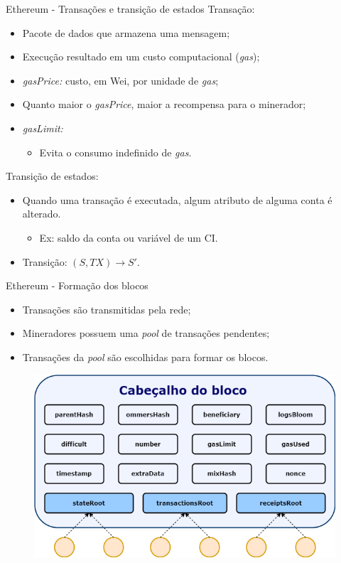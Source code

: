 \begin{frame}{Ethereum - Transações e transição de estados}
Transação: 
    \begin{itemize}
        \item Pacote de dados que armazena uma mensagem;
        \item Execução resultado em um custo computacional (\textit{gas});
        \item \textit{gasPrice:} custo, em Wei, por unidade de \textit{gas};
        \item Quanto maior o \textit{gasPrice}, maior a recompensa para o minerador;
        \item \textit{gasLimit:}
        \begin{itemize}
            \item Evita o consumo indefinido de \textit{gas}.
        \end{itemize}
    \end{itemize}
Transição de estados:
    \begin{itemize}
        \item Quando uma transação é executada, algum atributo de alguma conta é alterado.
        \begin{itemize}
            \item Ex: saldo da conta ou variável de um CI.
        \end{itemize}
        \item Transição: $(S, TX)\longrightarrow S'$.
    \end{itemize}
\end{frame}

\begin{frame}{Ethereum - Formação dos blocos}
    \begin{itemize}
        \item Transações são transmitidas pela rede;
        \item Mineradores possuem uma \textit{pool} de transações pendentes;
        \item Transações da \textit{pool} são escolhidas para formar os blocos.
    \end{itemize}
    \begin{figure}[!htb]
     \centering
     \includegraphics[scale=0.3]{figuras/blockchain/eth_block_header.png}
    \end{figure}    
\end{frame}


